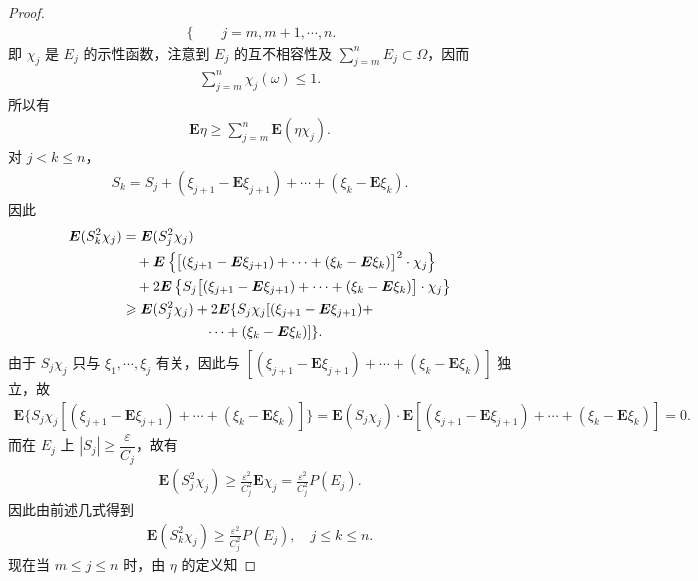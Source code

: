 \documentclass[../../main.tex]{subfiles}
\begin{document}
\begin{proof}
\begin{align}
\begin{cases}
\end{cases}\quad j=m,m+1,\cdots,n.
\end{align}
即 $\chi_j$ 是 $E_j$ 的示性函数，注意到 $E_j$ 的互不相容性及 $\sum_{j=m}^{n}E_j\subset\Omega$，因而
\begin{align}
\sum_{j=m}^{n}\chi_j(\omega)\leqslant1.
\end{align}
所以有
\begin{align}
\boldsymbol{E}\eta\geqslant\sum_{j=m}^{n}\boldsymbol{E}(\eta\chi_j).
\end{align}
对 $j<k\leqslant n$，
\begin{align*}
S_k=S_j+(\xi_{j+1}-\boldsymbol{E}\xi_{j+1})+\cdots+(\xi_k-\boldsymbol{E}\xi_k).
\end{align*}
因此
\begin{align}
\boldsymbol{E}(S_k^{2}\chi_j)&=\boldsymbol{E}(S_j^{2}\chi_j)\notag\\
&\quad+\boldsymbol{E}\left\{\bigl[(\xi_{j+1}-\boldsymbol{E}\xi_{j+1})+\cdots+(\xi_k-\boldsymbol{E}\xi_k)\bigr]^{2}\cdot\chi_j\right\}\notag\\
&\quad+2\boldsymbol{E}\left\{S_j\bigl[(\xi_{j+1}-\boldsymbol{E}\xi_{j+1})+\cdots+(\xi_k-\boldsymbol{E}\xi_k)\bigr]\cdot\chi_j\right\}\notag\\
&\geqslant\boldsymbol{E}(S_j^{2}\chi_j)+2\boldsymbol{E}\{S_j\chi_j[(\xi_{j+1}-\boldsymbol{E}\xi_{j+1})+\notag\\
&\qquad\qquad\qquad\cdots+(\xi_k-\boldsymbol{E}\xi_k)]\}.
\end{align}
由于 $S_j\chi_j$ 只与 $\xi_1,\cdots,\xi_j$ 有关，因此与 $[(\xi_{j+1}-\boldsymbol{E}\xi_{j+1})+\cdots+(\xi_k-\boldsymbol{E}\xi_k)]$ 独立，故
\begin{align}
\boldsymbol{E}\{S_j\chi_j[(\xi_{j+1}-\boldsymbol{E}\xi_{j+1})+\cdots+(\xi_k-\boldsymbol{E}\xi_k)]\}
=\boldsymbol{E}(S_j\chi_j)\cdot\boldsymbol{E}[(\xi_{j+1}-\boldsymbol{E}\xi_{j+1})+\cdots+(\xi_k-\boldsymbol{E}\xi_k)]=0.
\end{align}
而在 $E_j$ 上 $|S_j|\geqslant\dfrac{\varepsilon}{C_j}$，故有
\begin{align}
\boldsymbol{E}(S_j^{2}\chi_j)\geqslant\frac{\varepsilon^{2}}{C_j^{2}}\boldsymbol{E}\chi_j=\frac{\varepsilon^{2}}{C_j^{2}}P(E_j).
\end{align}
因此由前述几式得到
\begin{align}
\boldsymbol{E}(S_k^{2}\chi_j)\geqslant\frac{\varepsilon^{2}}{C_j^{2}}P(E_j),\quad j\leqslant k\leqslant n.
\end{align}
现在当 $m\leqslant j\leqslant n$ 时，由 $\eta$ 的定义知

\end{proof}
\end{document}
